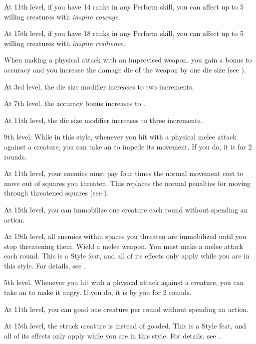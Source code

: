     At 11th level, if you have 14 ranks in any Perform skill, you can affect up to 5 willing creatures with \textit{inspire courage}.

    At 15th level, if you have 18 ranks in any Perform skill, you can affect up to 5 willing creatures with \textit{inspire resilience}.

    \featben When making a physical attack with an improvised weapon, you gain a  bonus to accuracy and you increase the damage die of the weapon by one die size (see ).

    At 3rd level, the die size modifier increases to two increments.

    At 7th level, the accuracy bonus increases to .

    At 11th level, the die size modifier increases to three increments.

    \featpre 9th level.
    \featben While in this style, whenever you hit with a physical melee attack against a creature, you can take an  to impede its movement.
    If you do, it is \immobilized for 2 rounds.

    At 11th level, your enemies must pay four times the normal movement cost to move out of squares you threaten.
    This replaces the normal penalties for moving through threatened squares (see ).

    At 15th level, you can immobilize one creature each round without spending an action.

    At 19th level, all enemies within spaces you threaten are immobilized until you stop threatening them.
    \stylereq Wield a melee weapon.
    You must make a melee attack each round.
     This is a Style feat, and all of its effects only apply while you are in this style.
    For details, see .

    \featpre 5th level.
    \featben Whenever you hit with a physical attack against a creature, you can take an  to make it angry.
    If you do, it is \goaded by you for 2 rounds.

    At 11th level, you can goad one creature per round without spending an action.

    At 15th level, the struck creature is \taunted instead of goaded.
     This is a Style feat, and all of its effects only apply while you are in this style.
    For details, see .

